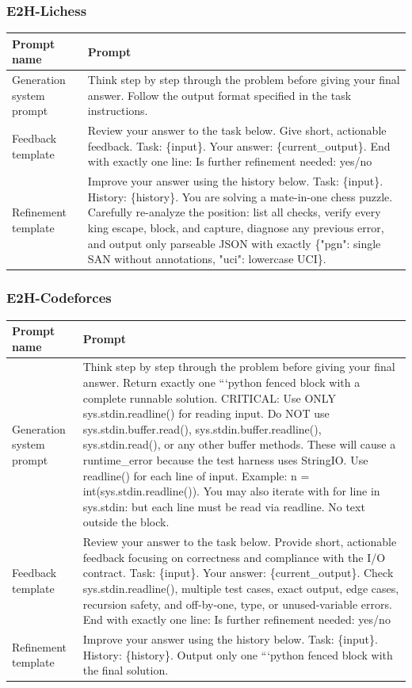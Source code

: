 \subsubsection*{E2H-Lichess}
\begin{tabular}{@{}Lp{.76\textwidth}@{}}\hline
\textbf{Prompt name} & \textbf{Prompt} \\ \hline
Generation system prompt & \tiny Think step by step through the problem before giving your final answer. Follow the output format specified in the task instructions. \\
Feedback template & \tiny Review your answer to the task below. Give short, actionable feedback. Task: \{input\}. Your answer: \{current\_output\}. End with exactly one line: Is further refinement needed: yes/no \\
Refinement template & \tiny Improve your answer using the history below. Task: \{input\}. History: \{history\}. You are solving a mate-in-one chess puzzle. Carefully re-analyze the position: list all checks, verify every king escape, block, and capture, diagnose any previous error, and output only parseable JSON with exactly \{"pgn": single SAN without annotations, "uci": lowercase UCI\}. \\ \hline
\end{tabular}
\subsubsection*{E2H-Codeforces}
\begin{tabular}{@{}Lp{.76\textwidth}@{}}\hline
\textbf{Prompt name} & \textbf{Prompt} \\ \hline
Generation system prompt & \tiny Think step by step through the problem before giving your final answer. Return exactly one ```python fenced block with a complete runnable solution. CRITICAL: Use ONLY sys.stdin.readline() for reading input. Do NOT use sys.stdin.buffer.read(), sys.stdin.buffer.readline(), sys.stdin.read(), or any other buffer methods. These will cause a runtime\_error because the test harness uses StringIO. Use readline() for each line of input. Example: n = int(sys.stdin.readline()). You may also iterate with for line in sys.stdin: but each line must be read via readline. No text outside the block. \\
Feedback template & \tiny Review your answer to the task below. Provide short, actionable feedback focusing on correctness and compliance with the I/O contract. Task: \{input\}. Your answer: \{current\_output\}. Check sys.stdin.readline(), multiple test cases, exact output, edge cases, recursion safety, and off-by-one, type, or unused-variable errors. End with exactly one line: Is further refinement needed: yes/no \\
Refinement template & \tiny Improve your answer using the history below. Task: \{input\}. History: \{history\}. Output only one ```python fenced block with the final solution. \\ \hline
\end{tabular}

